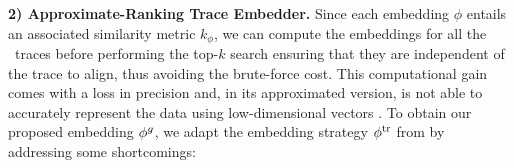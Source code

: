 {{	
\vspace{+0.2cm}	
\noindent
\textbf{2) Approximate-Ranking Trace Embedder.}\label{subsec:ate}
Since each embedding $\phi$ entails an associated similarity metric $k_\phi$, %
we can compute the embeddings for all the \unravelled\ traces
before performing the top-$k$ search ensuring that they are independent of the trace to align, thus avoiding the brute-force cost. This computational gain comes with a loss in precision %
 \cite{GartnerFW03} and, in its approximated version, is not able to accurately represent the data using low-dimensional vectors \cite{Seshadhri5631}. %
{To obtain our proposed embedding ${\phi^{g}}$, we adapt the embedding strategy} ${\phi^{\text{tr}}}$ from \cite{LodhiSSCW02} {by addressing some short\-comings: %
}}}
